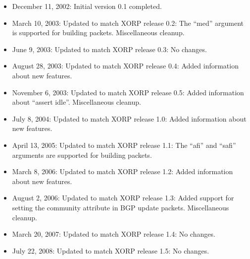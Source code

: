 \documentclass[11pt]{article}
\begin{document}
\begin{itemize}

  \item December 11, 2002: Initial version 0.1 completed.

  \item March 10, 2003: Updated to match XORP release 0.2:
   The ``med'' argument is supported for building packets.
   Miscellaneous cleanup.

  \item June 9, 2003: Updated to match XORP release 0.3:
   No changes.

  \item August 28, 2003: Updated to match XORP release 0.4:
   Added information about new features.

  \item November 6, 2003: Updated to match XORP release 0.5:
   Added information about ``assert idle''. Miscellaneous cleanup.

  \item July 8, 2004: Updated to match XORP release 1.0:
   Added information about new features.

  \item April 13, 2005: Updated to match XORP release 1.1:
   The ``afi'' and ``safi'' arguments are supported for building packets.

  \item March 8, 2006: Updated to match XORP release 1.2:
   Added information about new features.

  \item August 2, 2006: Updated to match XORP release 1.3:
   Added support for setting the community attribute in BGP update
   packets. Miscellaneous cleanup.

  \item March 20, 2007: Updated to match XORP release 1.4:
   No changes.

  \item July 22, 2008: Updated to match XORP release 1.5:
   No changes.

\end{itemize}



\end{document}
